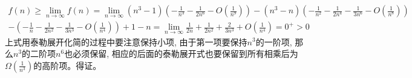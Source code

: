 \documentclass[paper=a4, fontsize=11pt]{scrartcl} %
\numberwithin{equation}{section} %
\numberwithin{figure}{section} %
\numberwithin{table}{section} %
\begin{document}
\begin{equation}
  \begin{split}
    f(n) \geq \lim_{n \to \infty} f(n)
    = \lim_{n \to \infty} (n^3 - 1)(-\frac{1}{n^3} - \frac{1}{2n^6} - O(\frac{1}{n^9})) - (n^3 - n)(-\frac{1}{n^2} - \frac{1}{2n^4} - \frac{1}{3n^6} - O(\frac{1}{n^8}))\\
    - (-\frac{1}{n} - \frac{1}{2n^2} - \frac{1}{3n^3} - O(\frac{1}{n^4})) + 1 - n
    = \lim_{n \to \infty} \frac{1}{2n} + \frac{1}{2n^2} + \frac{2}{3n^3} + O(\frac{1}{n^4}) = 0^+ > 0
  \end{split}
\end{equation}
上式用泰勒展开化简的过程中要注意保持小项, 由于第一项要保持$n^3$的一阶项, 那么$n^3$的二阶项$n^6$也必须保留, 相应的后面的泰勒展开式也要保留到所有相乘后为$\Omega(\frac{1}{n^3})$的高阶项。得证。
\end{document}
